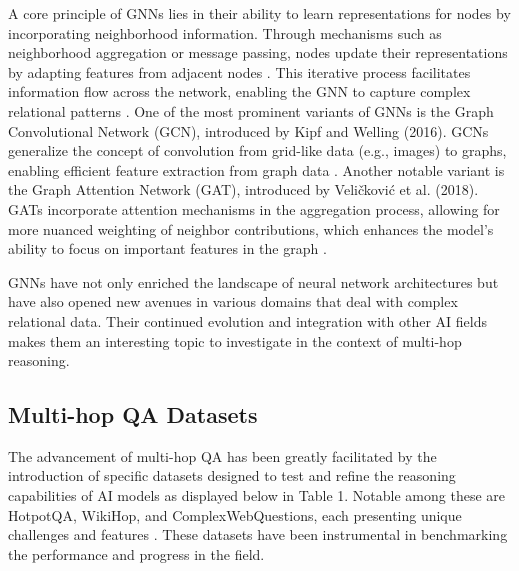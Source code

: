 \documentclass[sigplan,screen,nonacm]{acmart}
\begin{document}
A core principle of GNNs lies in their ability to learn representations for nodes by incorporating neighborhood information. Through mechanisms 
such as neighborhood aggregation or message passing, nodes update their representations by adapting features from adjacent nodes \cite{RN207}. 
This iterative process facilitates information flow across the network, enabling the GNN to capture complex relational patterns \cite{RN15}. 
One of the most prominent variants of GNNs is the Graph Convolutional Network (GCN), introduced by Kipf and Welling (2016). GCNs generalize 
the concept of convolution from grid-like data (e.g., images) to graphs, enabling efficient feature extraction from graph data \cite{RN2}. 
Another notable variant is the Graph Attention Network (GAT), introduced by Veličković et al. (2018). GATs incorporate attention mechanisms 
in the aggregation process, allowing for more nuanced weighting of neighbor contributions, which enhances the model's ability to focus on 
important features in the graph \cite{RN7}.

GNNs have not only enriched the landscape of neural network architectures but have also opened new avenues in various domains that deal with 
complex relational data. Their continued evolution and integration with other AI fields makes them an interesting topic to investigate in 
the context of multi-hop reasoning.


\subsection{Multi-hop QA Datasets}
The advancement of multi-hop QA has been greatly facilitated by the introduction of specific datasets designed to test and refine the reasoning 
capabilities of AI models as displayed below in Table 1. Notable among these are HotpotQA, WikiHop, and ComplexWebQuestions, each presenting 
unique challenges and features \cite{RN115}\cite{RN116}\cite{RN104}.
These datasets have been instrumental in benchmarking the performance and progress in the field. 
\end{document}
